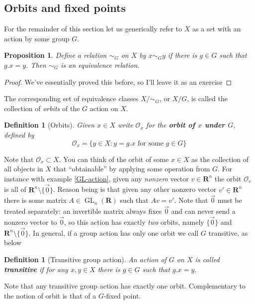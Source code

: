\documentclass[12pt]{article}
\numberwithin{equation}{subsection}
\newtheorem{prop}[subsection]{Proposition}
\newtheorem{defn}[subsection]{Definition}
\theoremstyle{note}
\newcommand{\GL}{\operatorname{GL}}
\begin{document}
\subsection{Orbits and fixed points}
For the remainder of this section let us generically refer to $X$ as a set with an action by some group $G$.

\begin{prop} Define a relation $\sim_G$ on $X$ by $x\sim_G y$ if there is $g\in G$ such that $g.x=y$. Then $\sim_G$ is an equivalence relation.
\end{prop}

\begin{proof} We've essentially proved this before, so I'll leave it as an exercise \end{proof}

The corresponding set of equivalence classes $X/\sim_G$, or $X/G$, is called the collection of \textit{orbits} of the $G$ action on $X$. 

\begin{defn}[Orbits] \label{def-orbits} Given $x\in X$ write $\mathcal{O}_x$ for the \textbf{orbit of $x$ under $G$}, defined by \begin{equation}
	\mathcal{O}_x=\{y \in X : y=g.x \text{ for some $g\in G$}\} 
	\end{equation}
\end{defn}
Note that $\mathcal{O}_x\subset X$. You can think of the orbit of some $x\in X$ as the collection of all objects in $X$ that ``obtainable'' by applying some operation from $G$. For instance with example \ref{GL-action}, given any \textit{nonzero} vector $v\in \mathbf{R}^n$ the orbit $\mathcal{O}_v$ is all of $\mathbf{R}^n\setminus\{\vec{0}\}$. Reason being is that given any other nonzero vector $v'\in\mathbf{R}^n$ there is some matrix $A\in \GL_n(\mathbf{R})$ such that $Av=v'$. Note that $\vec{0}$ must be treated separately: an invertible matrix always fixes $\vec 0$ and can never send a nonzero vector to $\vec 0$, so this action has exactly \textit{two} orbits, namely $\{\vec 0\}$ and $\mathbf{R}^n\setminus\{\vec 0\}$. In general, if a group action has only one orbit we call $G$ transitive, as below

\begin{defn}[Transitive group action] \label{def-trans}
	An action of $G$ on $X$ is called \textbf{transitive} if for any $x,y\in X$ there is $g\in G$ such that $g.x=y$. 
\end{defn}	

Note that any transitive group action has exactly one orbit. Complementary to the notion of orbit is that of a $G$-fixed point. 
\end{document}
